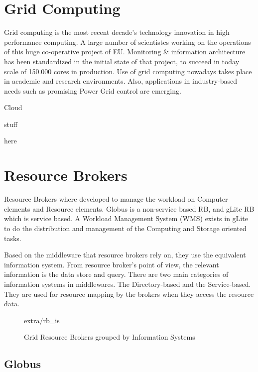 \section{Grid Computing}
Grid computing \cite{li2005grid} is the most recent decade's technology
innovation in high performance computing. A large number of scientistcs working
on the operations of this huge co-operative project of EU. Monitoring \&
information architecture \cite{fisher2002datagrid} has been standardized in the
initial state of that project, to succeed in today scale of 150.000 cores in
production. Use of grid computing nowadays takes place in academic and research
environments. Also, applications in industry-based needs such as promising
Power Grid control \cite{Taylor2006} are emerging.


Cloud

stuff

here

\section{Resource Brokers}
Resource Brokers \cite{Kertesz06ataxonomy} where developed to manage the
workload on Computer elements and Resource elements. Globus is a
non-service based RB, and gLite RB which is service based. A Workload
Management System (WMS) exists in gLite to do the distribution and management of
the Computing and Storage oriented tasks.

Based on the middleware that resource brokers rely on, they use the
equivalent information system. From resource broker's point of view, the
relevant information is the data store and query. There are two main categories
of information systems in middlewares. The Directory-based and the
Service-based. They are used for resource mapping by the brokers when they
access the resource data.

\begin{figure}
\begin{center}
 {extra/rb_is}
\caption{Grid Resource Brokers grouped by Information
Systems\cite{Kertesz06ataxonomy}}
\end{center}
\end{figure}

\subsection{Globus}

